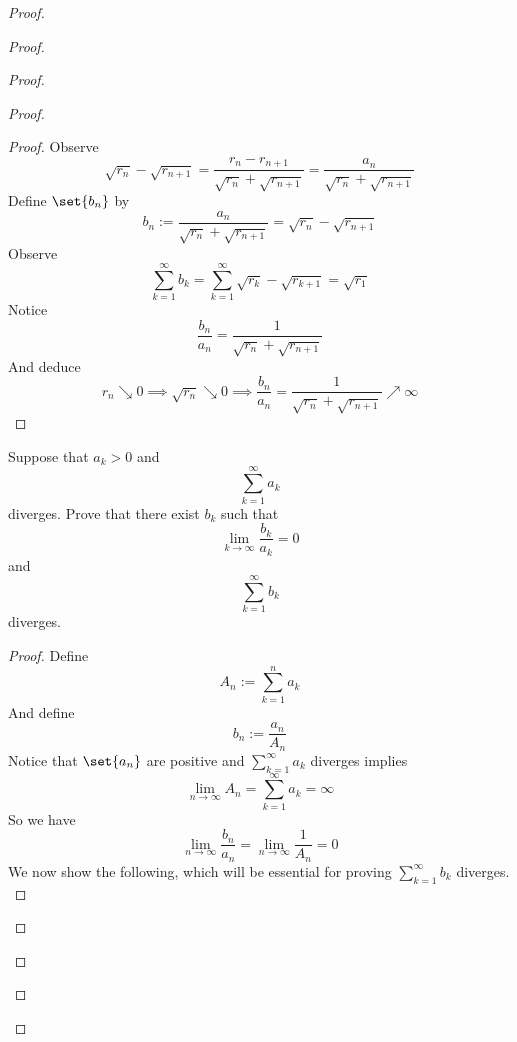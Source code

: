\documentclass{report}
\begin{document}
\begin{proof}
\begin{proof}
\begin{proof}
\begin{proof}
\begin{proof}
Observe
\begin{equation*}
\sqrt{r_n} -\sqrt{r_{n+1}}=\frac{r_n-r_{n+1}}{\sqrt{r_n} +\sqrt{r_{n+1}} }=\frac{a_n}{\sqrt{r_n} +\sqrt{r_{n+1}} }
\end{equation*}
Define $\set{b_n}$ by
\begin{equation*}
b_n:=\frac{a_n}{\sqrt{r_n} +\sqrt{r_{n+1}} }=\sqrt{r_n} -\sqrt{r_{n+1}} 
\end{equation*}
Observe
\begin{equation*}
\sum_{k=1}^\infty b_k=\sum_{k=1}^\infty \sqrt{r_k} -\sqrt{r_{k+1}}=\sqrt{r_1}  
\end{equation*}
Notice 
\begin{equation*}
\frac{b_n}{a_n}=\frac{1}{\sqrt{r_n} +\sqrt{r_{n+1}} }
\end{equation*}
And deduce
\begin{equation*}
r_n\searrow 0\implies \sqrt{r_n} \searrow 0\implies \frac{b_n}{a_n}=\frac{1}{\sqrt{r_n} +\sqrt{r_{n+1}} }\nearrow \infty
\end{equation*}
\end{proof}
\begin{question}{}{}
Suppose that \( a_k > 0 \) and 
\[
\sum_{k=1}^{\infty} a_k
\]
diverges. Prove that there exist \( b_k \) such that 
\[
\lim_{k \to \infty} \frac{b_k}{a_k} = 0
\]
and 
\[
\sum_{k=1}^{\infty} b_k
\]
diverges.
\end{question}
\begin{proof}
Define
\begin{equation*}
A_n:= \sum_{k=1}^n a_k
\end{equation*}
And define
\begin{equation*}
b_n:=\frac{a_n}{A_n}
\end{equation*}
Notice that $\set{a_n}$ are positive and $\sum_{k=1}^\infty a_k$ diverges implies 
\begin{equation*}
\lim_{n\to\infty}A_n=\sum_{k=1}^\infty a_k=\infty
\end{equation*}
So we have
\begin{equation*}
\lim_{n\to\infty}\frac{b_n}{a_n}=\lim_{n\to\infty}\frac{1}{A_n}=0
\end{equation*}
We now show the following, which will be essential for proving $\sum_{k=1}^\infty b_k$ diverges.\\


\end{proof}
\end{proof}
\end{proof}
\end{proof}
\end{proof}
\end{document}
